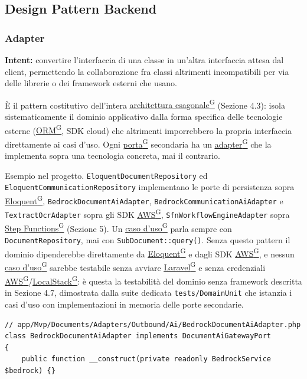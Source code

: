 \documentclass[a4paper,12pt]{article}
\providecommand{\glslink}[2]{\href{https://alittlebyte-19.github.io/Documentazione/glossario.html\#gls-#1}{\underline{#2}\textsuperscript{\scriptsize G}}}
\begin{document}
\begin{sloppypar}
\subsection{Design Pattern Backend}

\subsubsection{Adapter}

\textbf{Intent:} convertire l'interfaccia di una classe in un'altra interfaccia attesa dal client, permettendo la collaborazione fra classi altrimenti incompatibili per via delle librerie o dei framework esterni che usano.

È il pattern costitutivo dell'intera \glslink{architettura-esagonale}{architettura esagonale} (Sezione 4.3): isola sistematicamente il dominio applicativo dalla forma specifica delle tecnologie esterne (\glslink{orm-object-relational-mapping}{ORM}, SDK cloud) che altrimenti imporrebbero la propria interfaccia direttamente ai casi d'uso. Ogni \glslink{porta}{porta} secondaria ha un \glslink{adapter}{adapter} che la implementa sopra una tecnologia concreta, mai il contrario.

Esempio nel progetto. \texttt{EloquentDocumentRepository} ed \texttt{EloquentCommunicationRepository} implementano le porte di persistenza sopra \glslink{eloquent}{Eloquent}, \texttt{BedrockDocumentAiAdapter}, \texttt{BedrockCommunicationAiAdapter} e \texttt{TextractOcrAdapter} sopra gli SDK \glslink{aws}{AWS}, \texttt{SfnWorkflowEngineAdapter} sopra \glslink{step-functions}{Step Functions} (Sezione 5). Un \glslink{caso-d-uso-uc}{caso d'uso} parla sempre con \texttt{DocumentRepository}, mai con \texttt{SubDocument::query()}. Senza questo pattern il dominio dipenderebbe direttamente da \glslink{eloquent}{Eloquent} e dagli SDK \glslink{aws}{AWS}, e nessun \glslink{caso-d-uso-uc}{caso d'uso} sarebbe testabile senza avviare \glslink{laravel}{Laravel} e senza credenziali \glslink{aws}{AWS}/\glslink{localstack}{LocalStack}: è questa la testabilità del dominio senza framework descritta in Sezione 4.7, dimostrata dalla suite dedicata \texttt{tests/DomainUnit} che istanzia i casi d'uso con implementazioni in memoria delle porte secondarie.

\begin{lstlisting}[style=phplisting, caption={BedrockDocumentAiAdapter: adapter secondario sopra BedrockService}]
// app/Mvp/Documents/Adapters/Outbound/Ai/BedrockDocumentAiAdapter.php
class BedrockDocumentAiAdapter implements DocumentAiGatewayPort
{
    public function __construct(private readonly BedrockService $bedrock) {}


\end{lstlisting}
\end{sloppypar}
\end{document}
